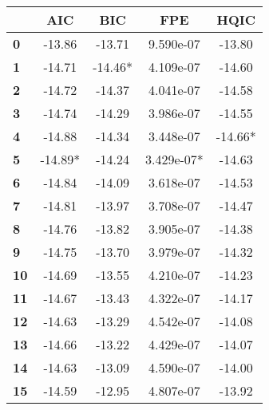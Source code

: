 \begin{center}
\begin{tabular}{lcccc}
\toprule
            & \textbf{AIC} & \textbf{BIC} & \textbf{FPE} & \textbf{HQIC}  \\
\midrule
\textbf{0}  &      -13.86  &      -13.71  &   9.590e-07  &       -13.80   \\
\textbf{1}  &      -14.71  &     -14.46*  &   4.109e-07  &       -14.60   \\
\textbf{2}  &      -14.72  &      -14.37  &   4.041e-07  &       -14.58   \\
\textbf{3}  &      -14.74  &      -14.29  &   3.986e-07  &       -14.55   \\
\textbf{4}  &      -14.88  &      -14.34  &   3.448e-07  &      -14.66*   \\
\textbf{5}  &     -14.89*  &      -14.24  &  3.429e-07*  &       -14.63   \\
\textbf{6}  &      -14.84  &      -14.09  &   3.618e-07  &       -14.53   \\
\textbf{7}  &      -14.81  &      -13.97  &   3.708e-07  &       -14.47   \\
\textbf{8}  &      -14.76  &      -13.82  &   3.905e-07  &       -14.38   \\
\textbf{9}  &      -14.75  &      -13.70  &   3.979e-07  &       -14.32   \\
\textbf{10} &      -14.69  &      -13.55  &   4.210e-07  &       -14.23   \\
\textbf{11} &      -14.67  &      -13.43  &   4.322e-07  &       -14.17   \\
\textbf{12} &      -14.63  &      -13.29  &   4.542e-07  &       -14.08   \\
\textbf{13} &      -14.66  &      -13.22  &   4.429e-07  &       -14.07   \\
\textbf{14} &      -14.63  &      -13.09  &   4.590e-07  &       -14.00   \\
\textbf{15} &      -14.59  &      -12.95  &   4.807e-07  &       -13.92   \\
\bottomrule
\end{tabular}
\end{center}